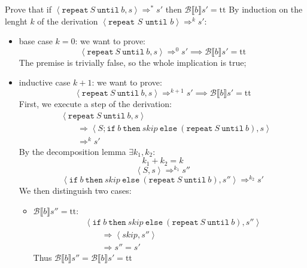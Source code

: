 \begin{exercise}{
    Prove that if $\left<\texttt{repeat}\ S\ \texttt{until}\ b, s\right> \Rightarrow^* s'$ then $\mathcal{B} \llbracket b \rrbracket s' = \text{tt}$
}
    By induction on the lenght $k$ of the derivation $\left<\texttt{repeat } S \texttt{ until } b\right> \Rightarrow^k s'$:
    \begin{itemize}
        \item base case $k=0$: we want to prove:
            \[ \left<\texttt{repeat}\ S\ \texttt{until}\ b,s\right> \Rightarrow^0 s' \implies \mathcal{B} \llbracket b \rrbracket s' = \text{tt} \]
            The premise is trivially false, so the whole implication is true;
        \item inductive case $k+1$: we want to prove:
            \[ \left<\texttt{repeat}\ S\ \texttt{until}\ b, s\right> \Rightarrow^{k+1} s' \implies \mathcal{B} \llbracket b \rrbracket s' = \text{tt} \]
            First, we execute a step of the derivation:
            \begin{align*}
                &\left<\texttt{repeat}\ S\ \texttt{until}\ b, s\right>
                \\&\qquad \Rightarrow \left<S; \texttt{if}\ b\ \texttt{then}\ skip\ \texttt{else}\ (\texttt{repeat}\ S\ \texttt{until}\ b), s\right>
                \\&\qquad \Rightarrow^k s'
            \end{align*}
            By the decomposition lemma $\exists k_1, k_2 :$
            \[ k_1 + k_2 = k \]
            \[ \left<S, s\right> \Rightarrow^{k_1} s'' \]
            \[ \left<\texttt{if}\ b\ \texttt{then}\ skip\ \texttt{else}\ (\texttt{repeat}\ S\ \texttt{until}\ b), s''\right> \Rightarrow^{k_2} s' \]
            We then distinguish two cases:
            \begin{itemize}
                \item $\mathcal{B} \llbracket b \rrbracket s'' = \text{tt}$:
                    \begin{align*}
                        &\left<\texttt{if}\ b\ \texttt{then}\ skip\ \texttt{else}\ (\texttt{repeat}\ S\ \texttt{until}\ b), s''\right>
                        \\&\qquad \Rightarrow \left<skip, s''\right>
                        \\&\qquad \Rightarrow s'' = s'
                    \end{align*}
                    Thus $\mathcal{B} \llbracket b \rrbracket s'' = \mathcal{B} \llbracket b \rrbracket s' = \text{tt}$

\end{itemize}
\end{itemize}
\end{exercise}
